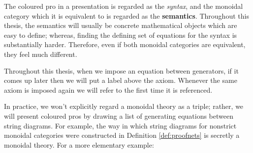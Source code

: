 \begin{definition}
The coloured pro in a presentation is regarded as the {\em syntax}, and the monoidal category which it is equivalent to is regarded as the {\bf semantics}.  Throughout this thesis, the semantics will usually be concrete mathematical objects which are easy to define; whereas, finding the defining set of equations for the syntax is substantially harder.  Therefore, even if both monoidal categories are equivalent, they feel much different.
\end{definition}



Throughout this thesis, when we impose an equation between generators, if it comes up later then we will put a label above the axiom.  Whenever the same axiom is imposed again we will refer to the first time it is referenced.

 In practice, we won't explicitly regard a  monoidal theory as a triple; rather, we will present coloured pros by drawing a list of generating equations between string diagrams.
For example, the way in which string diagrams for nonstrict monoidal categories were constructed in Definition \ref{def:proofnets} is secretly a monoidal theory.
For a more elementary example:
